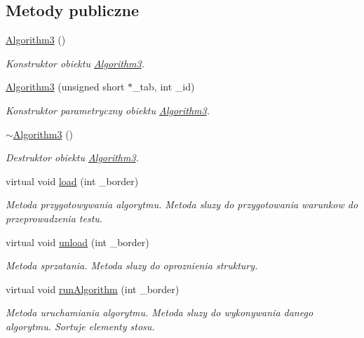 \subsection*{Metody publiczne}
\begin{DoxyCompactItemize}
\item 
\hyperlink{class_algorithm3_a88d9f8567616fd898bf202602726600d}{Algorithm3} ()
\begin{DoxyCompactList}\small\item\em Konstruktor obiektu \hyperlink{class_algorithm3}{Algorithm3}. \end{DoxyCompactList}\item 
\hyperlink{class_algorithm3_a71f0a79b028ae3c867321bcf19a45188}{Algorithm3} (unsigned short $\ast$\-\_\-tab, int \-\_\-id)
\begin{DoxyCompactList}\small\item\em Konstruktor parametryczny obiektu \hyperlink{class_algorithm3}{Algorithm3}. \end{DoxyCompactList}\item 
\hyperlink{class_algorithm3_ae9d1f5425fce3fc93d356fe8bf103e28}{$\sim$\-Algorithm3} ()
\begin{DoxyCompactList}\small\item\em Destruktor obiektu \hyperlink{class_algorithm3}{Algorithm3}. \end{DoxyCompactList}\item 
virtual void \hyperlink{class_algorithm3_a92b082327e99863c82981cdaec9a45a1}{load} (int \-\_\-border)
\begin{DoxyCompactList}\small\item\em Metoda przygotowywania algorytmu. Metoda sluzy do przygotowania warunkow do przeprowadzenia testu. \end{DoxyCompactList}\item 
virtual void \hyperlink{class_algorithm3_a170d77ee28866741214e65da7efcf533}{unload} (int \-\_\-border)
\begin{DoxyCompactList}\small\item\em Metoda sprzatania. Metoda sluzy do oproznienia struktury. \end{DoxyCompactList}\item 
virtual void \hyperlink{class_algorithm3_ac5c80b248190a12fa770e0386f694570}{run\-Algorithm} (int \-\_\-border)
\begin{DoxyCompactList}\small\item\em Metoda uruchamiania algorytmu. Metoda sluzy do wykonywania danego algorytmu. Sortuje elementy stosu. \end{DoxyCompactList}\end{DoxyCompactItemize}
